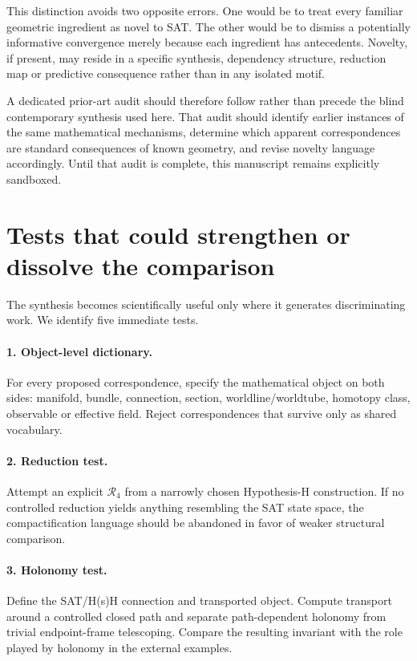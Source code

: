 \documentclass[11pt]{article}
\begin{document}
This distinction avoids two opposite errors. One would be to treat every familiar geometric ingredient as novel to SAT. The other would be to dismiss a potentially informative convergence merely because each ingredient has antecedents. Novelty, if present, may reside in a specific synthesis, dependency structure, reduction map or predictive consequence rather than in any isolated motif.

A dedicated prior-art audit should therefore follow rather than precede the blind contemporary synthesis used here. That audit should identify earlier instances of the same mathematical mechanisms, determine which apparent correspondences are standard consequences of known geometry, and revise novelty language accordingly. Until that audit is complete, this manuscript remains explicitly sandboxed.

\section{Tests that could strengthen or dissolve the comparison}
The synthesis becomes scientifically useful only where it generates discriminating work. We identify five immediate tests.

\paragraph{1. Object-level dictionary.} For every proposed correspondence, specify the mathematical object on both sides: manifold, bundle, connection, section, worldline/worldtube, homotopy class, observable or effective field. Reject correspondences that survive only as shared vocabulary.

\paragraph{2. Reduction test.} Attempt an explicit $\mathcal R_4$ from a narrowly chosen Hypothesis-H construction. If no controlled reduction yields anything resembling the SAT state space, the compactification language should be abandoned in favor of weaker structural comparison.

\paragraph{3. Holonomy test.} Define the SAT/H(s)H connection and transported object. Compute transport around a controlled closed path and separate path-dependent holonomy from trivial endpoint-frame telescoping. Compare the resulting invariant with the role played by holonomy in the external examples.
\end{document}
